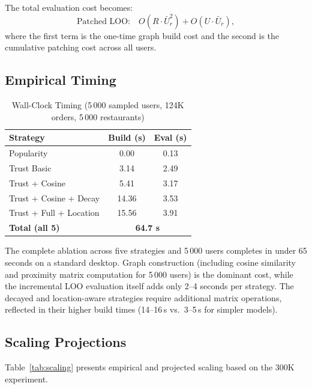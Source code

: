 \documentclass[conference]{IEEEtran}
\begin{document}
The total evaluation cost becomes:
\begin{equation}
  \text{Patched LOO:}\quad O(R \cdot \bar{U}_r^2) + O(U \cdot \bar{U}_r),
  \label{eq:patched}
\end{equation}
where the first term is the one-time graph build cost and the second is
the cumulative patching cost across all users.

\subsection{Empirical Timing}

\begin{table}[h]
\centering
\caption{Wall-Clock Timing (5\,000 sampled users, 124K orders, 5\,000 restaurants)}
\label{tab:timing}
\begin{tabular}{lcc}
\toprule
\textbf{Strategy} & \textbf{Build (s)} & \textbf{Eval (s)} \\
\midrule
Popularity              & 0.00  & 0.13 \\
Trust Basic             & 3.14  & 2.49 \\
Trust + Cosine          & 5.41  & 3.17 \\
Trust + Cosine + Decay  & 14.36 & 3.53 \\
Trust + Full + Location & 15.56 & 3.91 \\
\midrule
\textbf{Total (all 5)}  & \multicolumn{2}{c}{\textbf{64.7 s}} \\
\bottomrule
\end{tabular}
\end{table}

The complete ablation across five strategies and 5\,000 users completes in
under 65 seconds on a standard desktop.  Graph construction (including
cosine similarity and proximity matrix computation for 5\,000 users) is
the dominant cost, while the incremental LOO evaluation itself adds only
2--4 seconds per strategy.  The decayed and location-aware strategies
require additional matrix operations, reflected in their higher build
times (14--16\,s vs.\ 3--5\,s for simpler models).

\subsection{Scaling Projections}
Table~\ref{tab:scaling} presents empirical and projected scaling based
on the 300K experiment.
\end{document}
